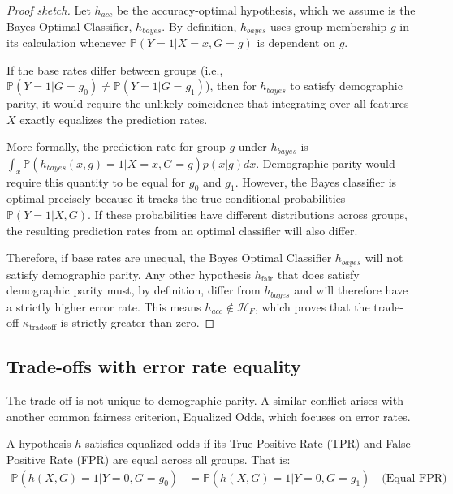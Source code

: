 \begin{proof}[Proof sketch]
Let $h_{acc}$ be the accuracy-optimal hypothesis, which we assume is the Bayes Optimal Classifier, $h_{bayes}$. By definition, $h_{bayes}$ uses group membership $g$ in its calculation whenever $\mathbb{P}(Y=1 | X=x, G=g)$ is dependent on $g$.

If the base rates differ between groups (i.e., $\mathbb{P}(Y=1|G=g_0) \neq \mathbb{P}(Y=1|G=g_1)$), then for $h_{bayes}$ to satisfy demographic parity, it would require the unlikely coincidence that integrating over all features $X$ exactly equalizes the prediction rates. 

More formally, the prediction rate for group $g$ under $h_{bayes}$ is $\int_x \mathbb{P}(h_{bayes}(x,g)=1 | X=x, G=g) p(x|g) dx$. Demographic parity would require this quantity to be equal for $g_0$ and $g_1$. However, the Bayes classifier is optimal precisely because it tracks the true conditional probabilities $\mathbb{P}(Y=1|X,G)$. If these probabilities have different distributions across groups, the resulting prediction rates from an optimal classifier will also differ.

Therefore, if base rates are unequal, the Bayes Optimal Classifier $h_{bayes}$ will not satisfy demographic parity. Any other hypothesis $h_{\text{fair}}$ that does satisfy demographic parity must, by definition, differ from $h_{bayes}$ and will therefore have a strictly higher error rate. This means $h_{acc} \notin \mathcal{H}_F$, which proves that the trade-off $\kappa_{\text{tradeoff}}$ is strictly greater than zero.
\end{proof}

\subsection{Trade-offs with error rate equality}

The trade-off is not unique to demographic parity. A similar conflict arises with another common fairness criterion, Equalized Odds, which focuses on error rates.

\begin{definition}
A hypothesis $h$ satisfies equalized odds if its True Positive Rate (TPR) and False Positive Rate (FPR) are equal across all groups. That is:
\begin{align}
\mathbb{P}(h(X,G)=1 | Y=0, G=g_0) &= \mathbb{P}(h(X,G)=1 | Y=0, G=g_1) \quad \text{(Equal FPR)}
\end{align}
\end{definition}

